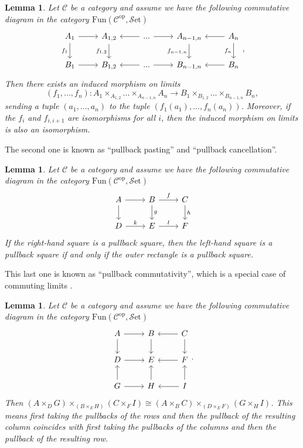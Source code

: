 \documentclass[11pt, a4paper]{amsart}
\newcommand{\cC}{\mathcal{C}}
\newcommand{\op}{\mathrm{op}}
\newcommand{\Fun}{\mathrm{Fun}}
\newcommand{\Set}{\mathscr{S}\mathrm{et}}
\newtheorem{lemma}[equation]{Lemma}
\theoremstyle{definition}
\theoremstyle{remark}
\numberwithin{equation}{section}
\begin{document}
\begin{lemma} \label{lemma:limit map}
 Let $\cC$ be a category and assume we have the following commutative diagram in the category $\Fun(\cC^{\op},\Set)$
  \[ 
  \begin{tikzcd}
   A_1 \arrow[r] \arrow[d, "f_1"'] & A_{1,2} \arrow[d, "f_{1,2}"'] & ... \arrow[r] \arrow[l] & A_{n-1,n} \arrow[d, "f_{n-1,n}"'] & A_n \arrow[d, "f_n"'] \arrow[l] \\ 
   B_1 \arrow[r] & B_{1,2} & ... \arrow[r] \arrow[l] & B_{n-1,n} & B_n \arrow[l]
  \end{tikzcd},
  \]
  Then there exists an induced morphism on limits 
  \[(f_1,...,f_n) \colon A_1 \times_{A_{1,2}} ... \times_{A_{n-1,n}} A_n \to B_1 \times_{B_{1,2}} ... \times_{B_{n-1,n}} B_n,\]
  sending a tuple $(a_1,...,a_n)$ to the tuple $(f_1(a_1),...,f_n(a_n))$. Moreover, if the $f_i$ and $f_{i,i+1}$ are isomorphisms for all $i$, then the induced morphism on limits is also an isomorphism.
\end{lemma}

The second one is known as ``pullback pasting'' and ``pullback cancellation''.

\begin{lemma} \label{lemma:pullback pasting}
 Let $\cC$ be a category and assume we have the following commutative diagram in the category $\Fun(\cC^{\op},\Set)$
  \[
  \begin{tikzcd}
  A \arrow[r] \arrow[d] & B \arrow[r, "f"] \arrow[d, "g"] & C \arrow[d, "h"]\\ 
  D \arrow[r, "k"] & E \arrow[r, "l"] & F
  \end{tikzcd}
  \]
  If the right-hand square is a pullback square, then the left-hand square is a pullback square if and only if the outer rectangle is a pullback square.
\end{lemma}

This last one is known as ``pullback commutativity'', which is a special case of commuting limits \cite[Section IX.8]{maclane1998categories}.

\begin{lemma} \label{lemma:pullback commutativity}
 Let $\cC$ be a category and assume we have the following commutative diagram in the category $\Fun(\cC^{\op},\Set)$
  \[
  \begin{tikzcd}
  A \arrow[r] \arrow[d] & B \arrow[d] & C \arrow[l] \arrow[d] \\ 
  D \arrow[r] & E & F \arrow[l] \\
  G \arrow[r] \arrow[u] & H \arrow[u] & I \arrow[l] \arrow[u] 
  \end{tikzcd}.
  \]
  Then $(A \times_D G) \times_{(B \times_E H)} (C \times_F I) \cong (A \times_B C) \times_{(D \times_E F)} (G \times_H I)$. This means first taking the pullbacks of the rows and then the pullback of the resulting column coincides with first taking the pullbacks of the columns and then the pullback of the resulting row.
\end{lemma}



\end{document}
